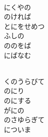 \documentclass[10pt,b5j]{tarticle} %
\begin{document}
\begin{enumerate}
\begin{minipage}[c]{\blocksize}
    \end{minipage}
    \begin{minipage}[c]{\blocksize}
        
        \vspace{\linespace}
        \item~\\
        にくやの\\
        のければ\\
        とにをせめつ\\
        ふしの\\
        ののをば\\
        にばなむ
        
    \end{minipage}
    \begin{minipage}[c]{\blocksize}
        
        \vspace{\linespace}
        \item~\\
        くのうらびて\\
        のにり\\
        のにする\\
        がにの\\
        のさゆらぎて\\
        についま
        
    \end{minipage}
    \begin{minipage}[c]{\blocksize}
        

\end{minipage}
\end{enumerate}
\end{document}
